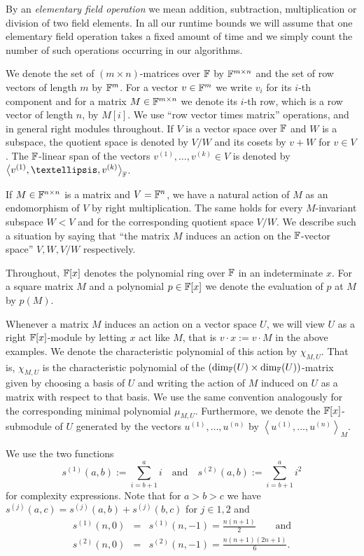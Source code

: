 By an \emph{elementary field operation} 
%
we mean addition, subtraction, multiplication or division of two field 
elements.
In all our runtime bounds we will assume that one elementary
field operation takes a fixed amount of time and we simply count
the number of such operations occurring in our algorithms.

We denote the set of $(m \times n)$-matrices over $\mathbb{F}$ by $\mathbb{F}^{m \times n}$
and the set of row vectors of length $m$ by $\mathbb{F}^m$. For a vector
$v \in \mathbb{F}^m$ we write $v_i$ for its $i$-th component and for a matrix 
$M \in \mathbb{F}^{m \times n}$ we denote its $i$-th row, which is
a row vector of length $n$, by $M[i]$. We use ``row vector
times matrix'' operations, and in general right modules throughout.
If $V$ is a vector space over $\mathbb{F}$ and $W$ is a subspace, the
quotient space is denoted by $V/W$ and its cosets by
$v+W$ for $v \in V$. The $\mathbb{F}$-linear span of the vectors
$v^{(1)}, \ldots, v^{(k)} \in V$ is denoted by 
$\left< v^{(1)}, \ldots, v^{(k)}\right>_\F$.

If $M \in \mathbb{F}^{n \times n}$ is a matrix and $V = \mathbb{F}^n$, we have a
natural action of $M$ as an endomorphism of $V$ by right multiplication.
The same holds for every $M$-invariant subspace $W < V$ and for
the corresponding quotient space $V/W$. We describe such a situation
by saying that ``the matrix $M$ induces an action on the $\mathbb{F}$-vector space''
$V, W, V/W$ respectively.

Throughout, $\mathbb{F}[x]$ denotes
the polynomial ring over $\mathbb{F}$ in an indeterminate $x$. For a square matrix $M$ and
a polynomial $p \in \mathbb{F}[x]$ we denote the evaluation of $p$ at $M$
by $p(M)$.

Whenever a matrix $M$ induces an action on a vector space $U$, we
will view $U$ as a right $\mathbb{F}[x]$-module by letting $x$ act like $M$,
that is $v \cdot x := v\cdot M$ in the above examples. We denote the
characteristic polynomial of this action by $\chi_{M,U}$. That is,
$\chi_{M,U}$ is the characteristic polynomial 
of the $(\dim_{\mathbb{F}}(U) \times \dim_{\mathbb{F}}(U))$-matrix given by choosing 
a basis of $U$ and writing the
action of $M$ induced on $U$ as a matrix with respect to that basis.
We use the same convention analogously for the corresponding minimal
polynomial $\mu_{M,U}$. Furthermore, we denote the $\mathbb{F}[x]$-submodule of
$U$ generated by the vectors $u^{(1)}, \ldots, u^{(n)}$ by $\left< u^{(1)}, \ldots,
u^{(n)} \right>_M$.

We use the two functions 
\begin{equation}\label{si}
s^{(1)}(a,b) := \sum_{i=b+1}^a i\quad \mbox{and}\quad
s^{(2)}(a,b) := \sum_{i=b+1}^a i^2
\end{equation}
for complexity expressions.
Note that for $a > b > c$ we have $s^{(j)}(a,c) = s^{(j)}(a,b) + s^{(j)}(b,c)$
for $j \in {1,2}$ and 
\begin{eqnarray}
\label{formels1}
s^{(1)}(n,0) &=& s^{(1)}(n,-1) = \frac{n(n+1)}{2}
\qquad\mbox{and} \\
\label{formels2}
s^{(2)}(n,0) &=& s^{(2)}(n,-1) = \frac{n(n+1)(2n+1)}{6}.
\end{eqnarray}

